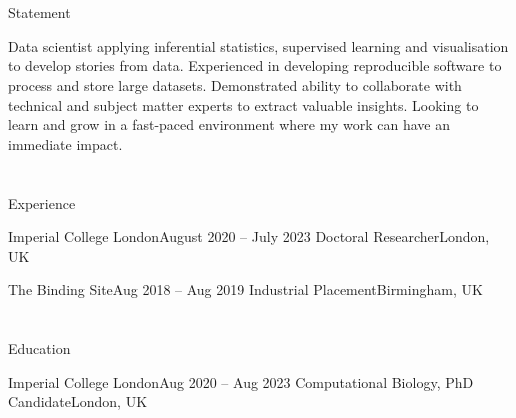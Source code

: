 

\newcommand{\resumeType}{bio}




\headertype{\orcid}{\github}{}{\phone}{\email}{} %
\vspace{-5pt} %

\section{\faGears}{Statement}
 \vspace{3pt}
 \resumeEntryStart
  {\small Data scientist applying inferential statistics, supervised learning and visualisation to develop stories from data. Experienced in developing reproducible software to process and store large datasets. Demonstrated ability to collaborate with technical and subject matter experts to extract valuable insights. Looking to learn and grow in a fast-paced environment where my work can have an immediate impact.\par}
 \resumeEntryEnd


\section{\faPieChart}{Experience}
    
\resumeEntryStart
    \resumeEntryTSDL
    {Imperial College London}{August 2020 -- July 2023}
    {Doctoral Researcher}{London, UK}
    \resumeItemListStart
        \resumeItem {}
    \resumeItemListEnd
    
    \resumeEntryTSDL
    {The Binding Site}{Aug 2018 -- Aug 2019}
    {Industrial Placement}{Birmingham, UK}
    \resumeItemListStart
    \resumeItemListEnd
\resumeEntryEnd

\section{\faGraduationCap}{Education}

  \resumeEntryStart
    \resumeEntryTSDL
      {Imperial College London}{Aug 2020 -- Aug 2023}
      {Computational Biology, PhD Candidate}{London, UK}
  \vspace{6pt}
  
